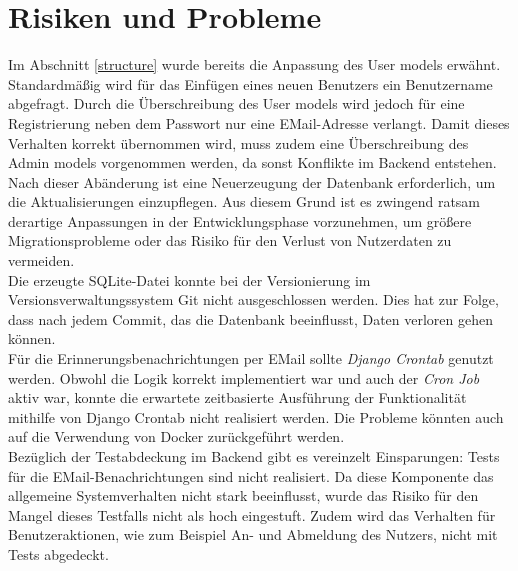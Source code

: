 \documentclass[conference]{IEEEtran}
\begin{document}
\section{Risiken und Probleme}
Im Abschnitt \ref{structure} wurde bereits die Anpassung des User models erwähnt. Standardmäßig wird für das Einfügen eines neuen Benutzers ein Benutzername abgefragt. Durch die Überschreibung des User models wird jedoch für eine Registrierung neben dem Passwort nur eine EMail-Adresse verlangt. Damit dieses Verhalten korrekt übernommen wird, muss zudem eine Überschreibung des Admin models vorgenommen werden, da sonst Konflikte im Backend entstehen. Nach dieser Abänderung ist eine Neuerzeugung der Datenbank erforderlich, um die Aktualisierungen einzupflegen. Aus diesem Grund ist es zwingend ratsam derartige Anpassungen in der Entwicklungsphase vorzunehmen, um größere Migrationsprobleme oder das Risiko für den Verlust von Nutzerdaten zu vermeiden.\\
Die erzeugte SQLite-Datei konnte bei der Versionierung im Versionsverwaltungssystem Git nicht ausgeschlossen werden. Dies hat zur Folge, dass nach jedem Commit, das die Datenbank beeinflusst, Daten verloren gehen können.\\
Für die Erinnerungsbenachrichtungen per EMail sollte \textit{Django Crontab} genutzt werden. Obwohl die Logik korrekt implementiert war und auch der \textit{Cron Job} aktiv war, konnte die erwartete zeitbasierte Ausführung der Funktionalität mithilfe von Django Crontab nicht realisiert werden. Die Probleme könnten auch auf die Verwendung von Docker zurückgeführt werden.\\
Bezüglich der Testabdeckung im Backend gibt es vereinzelt Einsparungen: Tests für die EMail-Benachrichtungen sind nicht realisiert. Da diese Komponente das allgemeine Systemverhalten nicht stark beeinflusst, wurde das Risiko für den Mangel dieses Testfalls nicht als hoch eingestuft.
Zudem wird das Verhalten für Benutzeraktionen, wie zum Beispiel An- und Abmeldung des Nutzers, nicht mit Tests abgedeckt.
\end{document}
